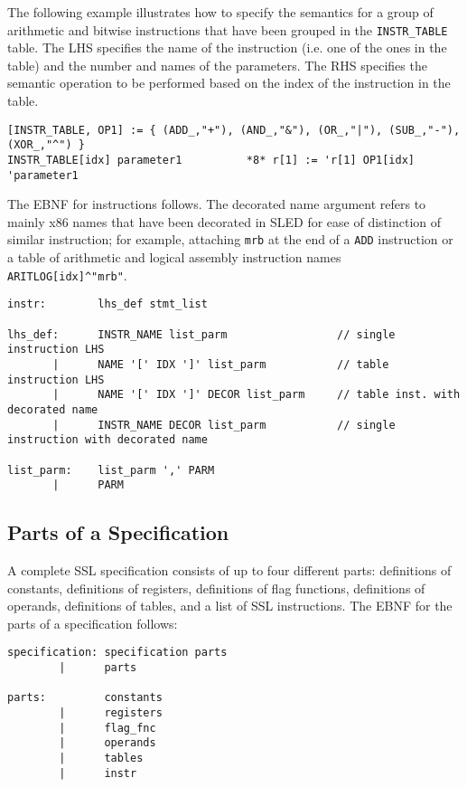 The following example illustrates how to specify the semantics for
a group of arithmetic and bitwise instructions that have been 
grouped in the \texttt{INSTR\_TABLE} table.  The LHS specifies the
name of the instruction (i.e. one of the ones in the table) and 
the number and names of the parameters.  The RHS specifies the 
semantic operation to be performed based on the index of the 
instruction in the table. 
{\small
\begin{verbatim}  
[INSTR_TABLE, OP1] := { (ADD_,"+"), (AND_,"&"), (OR_,"|"), (SUB_,"-"), (XOR_,"^") } 
INSTR_TABLE[idx] parameter1          *8* r[1] := 'r[1] OP1[idx] 'parameter1  
\end{verbatim}  
}

The EBNF for instructions follows.  The decorated
name argument refers to mainly x86 names that have been decorated in
SLED for ease of distinction of similar instruction; for example, 
attaching \texttt{mrb} at the end of a \texttt{ADD} instruction or a 
table of arithmetic and logical assembly instruction names 
\verb!ARITLOG[idx]^"mrb"!.
{\small
\begin{verbatim}
instr:        lhs_def stmt_list
 
lhs_def:      INSTR_NAME list_parm                 // single instruction LHS
       |      NAME '[' IDX ']' list_parm           // table instruction LHS
       |      NAME '[' IDX ']' DECOR list_parm     // table inst. with decorated name
       |      INSTR_NAME DECOR list_parm           // single instruction with decorated name
 
list_parm:    list_parm ',' PARM
       |      PARM
\end{verbatim}
}


\subsection{Parts of a Specification}
A complete SSL specification consists of up to four different
parts: definitions of constants, definitions of registers, definitions
of flag functions, definitions of operands, definitions of tables, and a 
list of SSL instructions.
The EBNF for the parts of a specification follows:
{\small
\begin{verbatim}
specification: specification parts
        |      parts

parts:         constants
        |      registers
        |      flag_fnc
        |      operands
        |      tables
        |      instr
\end{verbatim}
}



